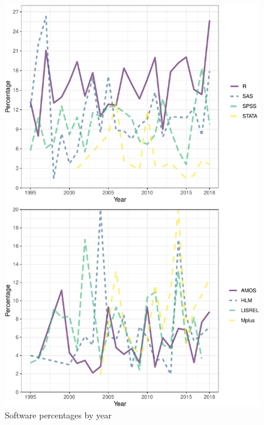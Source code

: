 \documentclass[english,,man]{apa6}
\theoremstyle{definition}
\theoremstyle{definition}
\theoremstyle{definition}
\theoremstyle{remark}
\begin{document}
\setlength{\parindent}{-0.5in}
\setlength{\leftskip}{0.5in}

\begin{figure}
\centering
\includegraphics{software_files/figure-latex/software-year-at1-1.pdf}
\caption{\label{fig:software-year-at1}Software percentages by year}
\end{figure}
\end{document}
